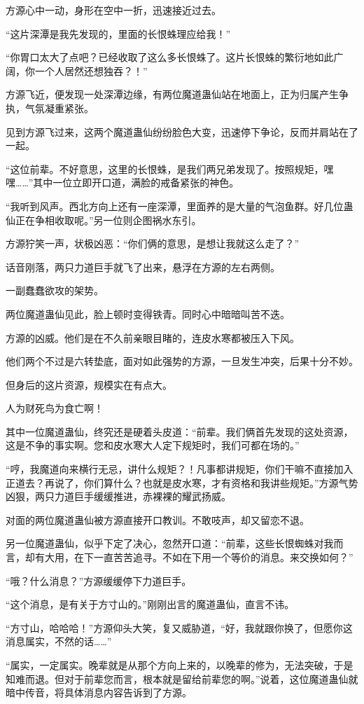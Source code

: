 \begin{this_body}
方源心中一动，身形在空中一折，迅速接近过去。

“这片深潭是我先发现的，里面的长恨蛛理应给我！”

“你胃口太大了点吧？已经收取了这么多长恨蛛了。这片长恨蛛的繁衍地如此广阔，你一个人居然还想独吞？！”

方源飞近，便发现一处深潭边缘，有两位魔道蛊仙站在地面上，正为归属产生争执，气氛凝重紧张。

见到方源飞过来，这两个魔道蛊仙纷纷脸色大变，迅速停下争论，反而并肩站在了一起。

“这位前辈。不好意思，这里的长恨蛛，是我们两兄弟发现了。按照规矩，嘿嘿……”其中一位立即开口道，满脸的戒备紧张的神色。

“我听到风声。西北方向上还有一座深潭，里面养的是大量的气泡鱼群。好几位蛊仙正在争相收取呢。”另一位则企图祸水东引。

方源狞笑一声，状极凶恶：“你们俩的意思，是想让我就这么走了？”

话音刚落，两只力道巨手就飞了出来，悬浮在方源的左右两侧。

一副蠢蠢欲攻的架势。

两位魔道蛊仙见此，脸上顿时变得铁青。同时心中暗暗叫苦不迭。

方源的凶威。他们是在不久前亲眼目睹的，连皮水寒都被压入下风。

他们两个不过是六转垫底，面对如此强势的方源，一旦发生冲突，后果十分不妙。

但身后的这片资源，规模实在有点大。

人为财死鸟为食亡啊！

其中一位魔道蛊仙，终究还是硬着头皮道：“前辈。我们俩首先发现的这处资源，这是不争的事实啊。您和皮水寒大人定下规矩时，我们可都在场的。”

“哼，我魔道向来横行无忌，讲什么规矩？！凡事都讲规矩，你们干嘛不直接加入正道去？再说了，你们算什么？也就是皮水寒，才有资格和我讲些规矩。”方源气势凶狠，两只力道巨手缓缓推进，赤裸裸的耀武扬威。

对面的两位魔道蛊仙被方源直接开口教训。不敢吱声，却又留恋不退。

另一位魔道蛊仙，似乎下定了决心，忽然开口道：“前辈，这些长恨蜘蛛对我而言，却有大用，在下一直苦苦追寻。不如在下用一个等价的消息。来交换如何？”

“哦？什么消息？”方源缓缓停下力道巨手。

“这个消息，是有关于方寸山的。”刚刚出言的魔道蛊仙，直言不讳。

“方寸山，哈哈哈！”方源仰头大笑，复又威胁道，“好，我就跟你换了，但愿你这消息属实，不然的话……”

“属实，一定属实。晚辈就是从那个方向上来的，以晚辈的修为，无法突破，于是知难而退。但对于前辈您而言，根本就是留给前辈您的啊。”说着，这位魔道蛊仙就暗中传音，将具体消息内容告诉到了方源。


\end{this_body}
